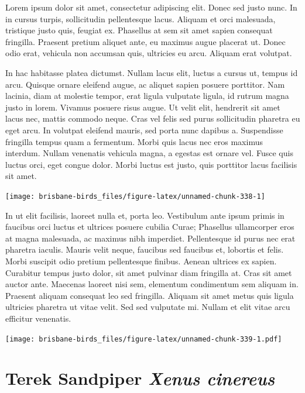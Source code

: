 \documentclass[]{book}
\let\origfigure\figure
\let\endorigfigure\endfigure
\renewenvironment{figure}[1][2] {
  \expandafter\origfigure\expandafter[H]
} {
  \endorigfigure
}
\begin{document}
Lorem ipsum dolor sit amet, consectetur adipiscing elit. Donec sed justo
nunc. In in cursus turpis, sollicitudin pellentesque lacus. Aliquam et
orci malesuada, tristique justo quis, feugiat ex. Phasellus at sem sit
amet sapien consequat fringilla. Praesent pretium aliquet ante, eu
maximus augue placerat ut. Donec odio erat, vehicula non accumsan quis,
ultricies eu arcu. Aliquam erat volutpat.

In hac habitasse platea dictumst. Nullam lacus elit, luctus a cursus ut,
tempus id arcu. Quisque ornare eleifend augue, ac aliquet sapien posuere
porttitor. Nam lacinia, diam at molestie tempor, erat ligula vulputate
ligula, id rutrum magna justo in lorem. Vivamus posuere risus augue. Ut
velit elit, hendrerit sit amet lacus nec, mattis commodo neque. Cras vel
felis sed purus sollicitudin pharetra eu eget arcu. In volutpat eleifend
mauris, sed porta nunc dapibus a. Suspendisse fringilla tempus quam a
fermentum. Morbi quis lacus nec eros maximus interdum. Nullam venenatis
vehicula magna, a egestas est ornare vel. Fusce quis luctus orci, eget
congue dolor. Morbi luctus est justo, quis porttitor lacus facilisis sit
amet.

\begin{figure}
\texttt{[image: brisbane-birds\_files/figure-latex/unnamed-chunk-338-1]} \caption{insert figure caption}\label{fig:unnamed-chunk-338}
\end{figure}

In ut elit facilisis, laoreet nulla et, porta leo. Vestibulum ante ipsum
primis in faucibus orci luctus et ultrices posuere cubilia Curae;
Phasellus ullamcorper eros at magna malesuada, ac maximus nibh
imperdiet. Pellentesque id purus nec erat pharetra iaculis. Mauris velit
neque, faucibus sed faucibus et, lobortis et felis. Morbi suscipit odio
pretium pellentesque finibus. Aenean ultrices ex sapien. Curabitur
tempus justo dolor, sit amet pulvinar diam fringilla at. Cras sit amet
auctor ante. Maecenas laoreet nisi sem, elementum condimentum sem
aliquam in. Praesent aliquam consequat leo sed fringilla. Aliquam sit
amet metus quis ligula ultricies pharetra ut vitae velit. Sed sed
vulputate mi. Nullam et elit vitae arcu efficitur venenatis.

\begin{figure}
\centering
\texttt{[image: brisbane-birds\_files/figure-latex/unnamed-chunk-339-1.pdf]}
\caption{\label{fig:unnamed-chunk-339}insert figure caption}
\end{figure}

\section{\texorpdfstring{Terek Sandpiper \emph{Xenus
cinereus}}{Terek Sandpiper Xenus cinereus}}\label{terek-sandpiper-xenus-cinereus}
\end{document}
